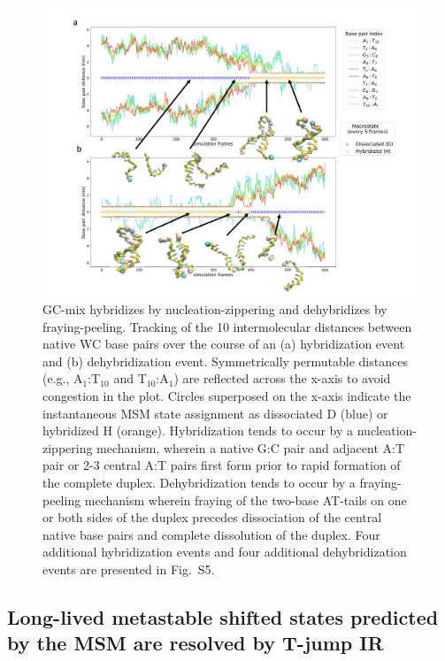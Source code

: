 \documentclass[journal=jpcbfk,manuscript=article]{achemso}
\newcommand*{\blauw}[1]{{#1}}
\begin{document}
\begin{figure}[ht!]
	\begin{center}
	\includegraphics[width=180mm, scale=1]{Fig4.pdf}
        \caption{GC-mix hybridizes by nucleation-zippering and dehybridizes by fraying-peeling. Tracking of the 10 intermolecular distances between native WC base pairs over the course of an (a) hybridization event and (b) dehybridization event. Symmetrically permutable distances (e.g., A$_1$:T$_{10}$ and T$_{10}$:A$_1$) are reflected across the x-axis to avoid congestion in the plot. Circles superposed on the x-axis indicate the instantaneous MSM state assignment as dissociated D (blue) or hybridized H (orange). Hybridization tends to occur by a nucleation-zippering mechanism, wherein a native G:C pair and adjacent A:T pair or 2-3 central A:T pairs first form prior to rapid formation of the complete duplex. Dehybridization tends to occur by a fraying-peeling mechanism wherein fraying of the two-base AT-tails on one or both sides of the duplex precedes dissociation of the central native base pairs and complete dissolution of the duplex. Four additional hybridization events and four additional dehybridization events are presented in \blauw{Fig.~S5}.
        }
        \label{fig:GC-mix_transitions}
	\end{center}
\end{figure}


\subsection{\label{sec:stretch_comparison}Long-lived metastable shifted states predicted by the MSM are resolved by T-jump IR}
\end{document}
